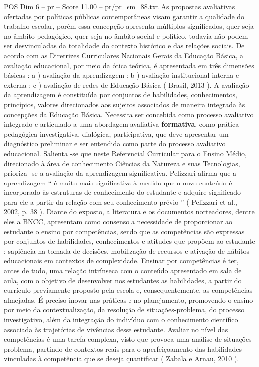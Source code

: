 \begin{textsample}{POS Dim 6 – pr – Score 11.00 – pr/pr\_em\_88.txt}
As propostas avaliativas ofertadas por políticas públicas contemporâneas visam garantir a qualidade do trabalho escolar, porém essa concepção apresenta múltiplos significados, quer seja no âmbito pedagógico, quer seja no âmbito social e político, todavia não podem ser desvinculadas da totalidade do contexto histórico e das relações sociais.
De acordo com as Diretrizes Curriculares Nacionais Gerais da Educação Básica, a avaliação educacional, por meio da ótica teórica, é apresentada em três dimensões básicas : a ) avaliação da aprendizagem ; b ) avaliação institucional interna e externa ; c ) avaliação de redes de Educação Básica ( Brasil, 2013 ).
A avaliação da aprendizagem é constituída por conjuntos de habilidades, conhecimentos, princípios, valores direcionados aos sujeitos associados de maneira integrada às concepções da Educação Básica.
Necessita ser concebida como processo avaliativo integrado e articulado a uma abordagem avaliativa \textbf{formativa}, como prática pedagógica investigativa, dialógica, participativa, que deve apresentar um diagnóstico preliminar e ser entendida como parte do processo avaliativo educacional.
Salienta -se que neste Referencial Curricular para o Ensino Médio, direcionado à área de conhecimento Ciências da Natureza e suas Tecnologias, prioriza -se a avaliação da aprendizagem significativa.
Pelizzari afirma que a aprendizagem “ é muito mais significativa à medida que o novo conteúdo é incorporado às estruturas de conhecimento do estudante e adquire significado para ele a partir da relação com seu conhecimento prévio ” ( Pelizzari et al., 2002, p. 38 ).
Diante do exposto, a literatura e os documentos norteadores, dentre eles a BNCC, apresentam como consenso a necessidade de proporcionar ao estudante o ensino por competências, sendo que as competências são expressas por conjuntos de habilidades, conhecimentos e atitudes que propõem ao estudante : sapiência na tomada de decisões, mobilização de recursos e ativação de hábitos educacionais em contextos de complexidade.
Ensinar por competências é ter, antes de tudo, uma relação intrínseca com o conteúdo apresentado em sala de aula, com o objetivo de desenvolver nos estudantes as habilidades, a partir do currículo previamente proposto pela escola e, consequentemente, as competências almejadas.
É preciso inovar nas práticas e no planejamento, promovendo o ensino por meio da contextualização, da resolução de situações-problema, do processo investigativo, além da integração do indivíduo com o conhecimento científico associada às trajetórias de vivências desse estudante.
Avaliar no nível das competências é uma tarefa complexa, visto que provoca uma análise de situações-problema, partindo de contextos reais para o aperfeiçoamento das habilidades vinculadas à competência que se deseja quantificar ( Zabala e Arnau, 2010 ).

\end{textsample}
